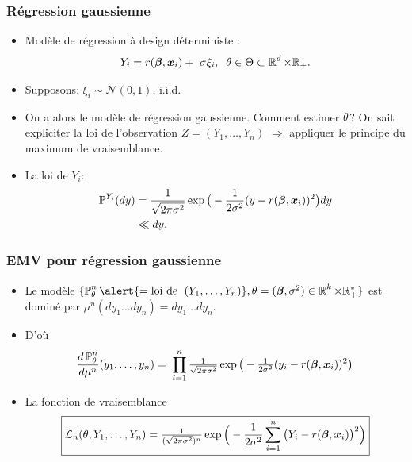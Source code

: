 \begin{frame}
\frametitle{Régression gaussienne}


\begin{itemize}
\item  Modèle de régression à design déterministe :
$$Y_i =
r({\boldsymbol{\beta}},\operatorname{\boldsymbol{x}}_i)+\ \sigma \xi_i,\;\;\theta \in \Theta\subset  \operatorname{{\mathbb R}}^d \times \mathbb{R}_+.$$
\item  Supposons: $\xi_i \sim {\mathcal N}(0,1)$, i.i.d.
\item On a alors le modèle de \alert{régression gaussienne}.
Comment estimer $\theta$?  \alert{On sait expliciter la loi
de l'observation} $Z=(Y_1,\dots,Y_n)$ $\Longrightarrow$ appliquer le
principe du maximum de vraisemblance.

\item La loi de $Y_i$:
\begin{align*}
\operatorname{{\mathbb P}}^{Y_i}(dy) & = \frac{1}{\sqrt{2\pi \sigma^2}}\exp\big
(-\frac{1}{2\sigma^2}(y-r({\boldsymbol{\beta}},\operatorname{\boldsymbol{x}}_i))^2\big)dy \\
& \ll dy.
\end{align*}

\end{itemize}
\end{frame}

\begin{frame}
\frametitle{EMV pour régression gaussienne}
\begin{itemize}
\item  Le modèle $\{\PP_\truetheta^n \alert{ = \text{loi de }\;(Y_1,\ldots, Y_n)},\truetheta = (\truebeta,\sigma^2) \in \R^k \times \rset_+^* \}$ est \alert{dominé} par
$\mu^n(dy_1\ldots dy_n) = dy_1\ldots dy_n.$
\item D'où
\[
 \frac{d\operatorname{{\mathbb P}}_\theta^n}{d\mu^n}(y_1,\ldots, y_n)
  =\; \prod_{i=1}^n \tfrac{1}{\sqrt{2\pi \sigma^2}}\exp
  \big(-\tfrac{1}{2\sigma^2}(y_i-r({\boldsymbol{\beta}},\operatorname{\boldsymbol{x}}_i))^2\big)
\]
\item La fonction de vraisemblance
$$\boxed{{\mathcal L}_n(\theta, Y_1,\ldots, Y_n)
= \tfrac{1}{(\sqrt{2\pi \sigma^2})^{n}} \exp\Big(-\frac{1}{2\sigma^2}\sum_{i = 1}^n\big(Y_i-
r({\boldsymbol{\beta}},\operatorname{\boldsymbol{x}}_i)\big)^2\Big)}$$
\end{itemize}
\end{frame}

